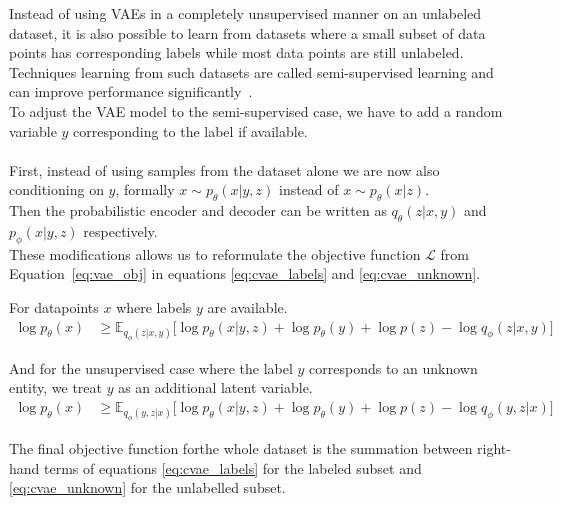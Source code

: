 Instead of using VAEs in a completely unsupervised manner on an unlabeled dataset, it is also possible to learn from datasets where a small subset of data points has corresponding labels while most data points are still unlabeled.
Techniques learning from such datasets are called semi-supervised learning and can improve performance significantly~\cite{cvae:2014}\cite{cvae_2:2015}.\\
%
To adjust the VAE model to the semi-supervised case, we have to add a random variable $y$ corresponding to the label if available.\\\\
First, instead of using samples from the dataset alone we are now also conditioning on $y$, formally 
$x \sim p_\theta(x|y,z)$ instead of $x \sim p_\theta(x|z)$.\\
Then the probabilistic encoder and decoder can be written as $q_\theta(z|x,y)$ and $p_\phi(x|y,z)$ respectively.\\
%
%
%
%
%
These modifications allows us to reformulate the objective function $\mathcal{L}$ from Equation~\ref{eq:vae_obj} in equations \ref{eq:cvae_labels} and \ref{eq:cvae_unknown}.

For datapoints $x$ where labels $y$ are available.
\begin{align}
  \label{eq:cvae_labels}
  \log p_\theta(x) &\geq \mathbb{E}_{q_\phi(z|x,y)} \bigg[\log p_\theta(x|y,z) + \log p_\theta(y) + \log p(z) - \log q_\phi(z|x,y)\bigg]
\end{align}

And for the unsupervised case where the label $y$ corresponds to an unknown entity, we treat $y$ as an additional latent variable.
\begin{align}
  \label{eq:cvae_unknown}
  \log p_\theta(x) &\geq \mathbb{E}_{q_\phi(y,z|x)} \bigg[\log p_\theta(x|y,z) + \log p_\theta(y) + \log p(z) - \log q_\phi(y,z|x)\bigg]
\end{align}

The final objective function forthe  whole dataset is the summation between right-hand terms of equations \ref{eq:cvae_labels} for the labeled subset and \ref{eq:cvae_unknown} for the unlabelled subset.
